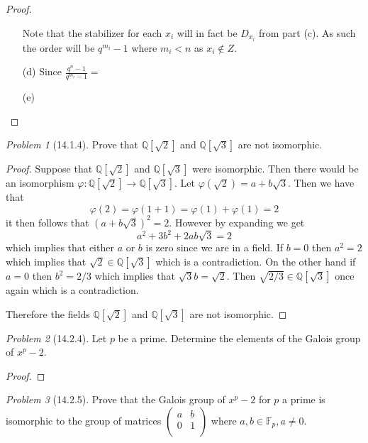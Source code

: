 \documentclass[10pt]{article}
\newcommand{\sk}{\vskip 10mm}
\newcommand{\bb}[1]{\mathbb{#1}}
\theoremstyle{remark}
\newtheorem{problem}{Problem}
\theoremstyle{remark}
\begin{document}
\begin{proof}
\begin{enumerate}
    Note that the stabilizer for each $x_i$ will in fact be $D_{x_i}$ from
    part (c). As such the order will be $q^{m_i}-1$ where $m_i<n$ as $x_i\notin Z$.
  \item[(d)] Since $\frac{q^n-1}{q^{m_i}-1}=$
  \item[(e)]
  \end{enumerate}
\end{proof}

\sk

\begin{problem}[14.1.4]
  Prove that $\bb{Q}[\sqrt{2}]$ and $\bb{Q}[\sqrt{3}]$ are not isomorphic.
\end{problem}

\begin{proof}
  Suppose that $\bb{Q}[\sqrt{2}]$ and $\bb{Q}[\sqrt{3}]$ were isomorphic.
  Then there would be an isomorphism $\varphi:\bb{Q}[\sqrt{2}]\rightarrow\bb{Q}[\sqrt{3}]$.
  Let $\varphi(\sqrt{2})=a+b\sqrt{3}$. Then we have that
  \[ \varphi(2)=\varphi(1+1)=\varphi(1)+\varphi(1)=2\]
  it then follows that $(a+b\sqrt{3})^2=2$. However by expanding we get
  \[ a^2+3b^2+2ab\sqrt{3}=2 \]
  which implies that either $a$ or $b$ is zero since we are in a field.
  If $b=0$ then $a^2=2$ which implies that $\sqrt{2}\in\bb{Q}[\sqrt{3}]$ which is
  a contradiction. On the other hand if $a=0$ then $b^2=2/3$ which
  implies that $\sqrt{3}b=\sqrt{2}$. Then $\sqrt{2/3}\in\bb{Q}[\sqrt{3}]$
  once again which is a contradiction.

  Therefore the fields $\bb{Q}[\sqrt{2}]$ and $\bb{Q}[\sqrt{3}]$ are
  not isomorphic.
\end{proof}

\sk

\begin{problem}[14.2.4]
  Let $p$ be a prime. Determine the elements of the Galois group of $x^p-2$.
\end{problem}

\begin{proof}
  
\end{proof}

\sk

\begin{problem}[14.2.5]
  Prove that the Galois group of $x^p-2$ for $p$ a prime is isomorphic to
  the group of matrices $\left(\begin{array}{cc}a&b\\0&1\\ \end{array}\right)$
  where $a,b\in\bb{F}_p,a\neq 0$.
\end{problem}
\end{document}

